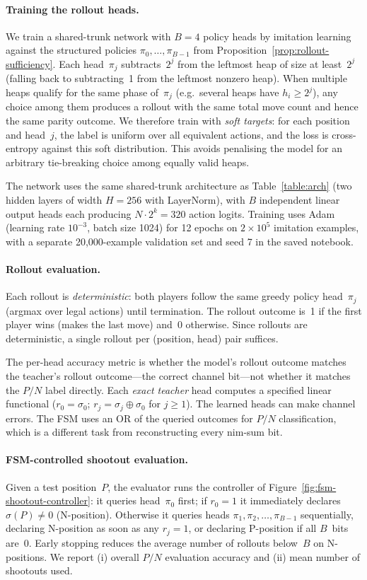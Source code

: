 \documentclass[twoside,11pt]{article}
\numberwithin{theorem}{section}
\numberwithin{equation}{section}
\begin{document}
\paragraph{Training the rollout heads.}
We train a shared-trunk network with $B=4$ policy heads by imitation learning against the structured policies $\pi_0,\dots,\pi_{B-1}$ from Proposition~\ref{prop:rollout-sufficiency}.
Each head~$\pi_j$ subtracts~$2^j$ from the leftmost heap of size at least~$2^j$ (falling back to subtracting~1 from the leftmost nonzero heap).
When multiple heaps qualify for the same phase of~$\pi_j$ (e.g.\ several heaps have $h_i \geq 2^j$), any choice among them produces a rollout with the same total move count and hence the same parity outcome.
We therefore train with \emph{soft targets}: for each position and head~$j$, the label is uniform over all equivalent actions, and the loss is cross-entropy against this soft distribution.
This avoids penalising the model for an arbitrary tie-breaking choice among equally valid heaps.

The network uses the same shared-trunk architecture as Table~\ref{table:arch} (two hidden layers of width $H=256$ with LayerNorm), with $B$ independent linear output heads each producing $N \cdot 2^k = 320$ action logits.
Training uses Adam (learning rate $10^{-3}$, batch size 1024) for 12 epochs on $2\times10^5$ imitation examples, with a separate 20,000-example validation set and seed 7 in the saved notebook.

\paragraph{Rollout evaluation.}
Each rollout is \emph{deterministic}: both players follow the same greedy policy head~$\pi_j$ (argmax over legal actions) until termination.
The rollout outcome is~1 if the first player wins (makes the last move) and~0 otherwise.
Since rollouts are deterministic, a single rollout per (position, head) pair suffices.

The per-head accuracy metric is whether the model's rollout outcome matches the teacher's rollout outcome---the correct channel bit---not whether it matches the $P/N$ label directly.
Each \emph{exact teacher} head computes a specified linear functional ($r_0=\sigma_0$; $r_j=\sigma_j\oplus\sigma_0$ for $j\ge1$). The learned heads can make channel errors. The FSM uses an OR of the queried outcomes for $P/N$ classification, which is a different task from reconstructing every nim-sum bit.

\paragraph{FSM-controlled shootout evaluation.}
Given a test position~$P$, the evaluator runs the controller of Figure~\ref{fig:fsm-shootout-controller}:
it queries head~$\pi_0$ first; if $r_0 = 1$ it immediately declares $\sigma(P) \neq 0$ (N-position).
Otherwise it queries heads $\pi_1, \pi_2, \ldots, \pi_{B-1}$ sequentially, declaring N-position as soon as any $r_j = 1$, or declaring P-position if all $B$~bits are~0.
Early stopping reduces the average number of rollouts below~$B$ on N-positions.
We report (i) overall $P/N$ evaluation accuracy and (ii) mean number of shootouts used.
\end{document}
